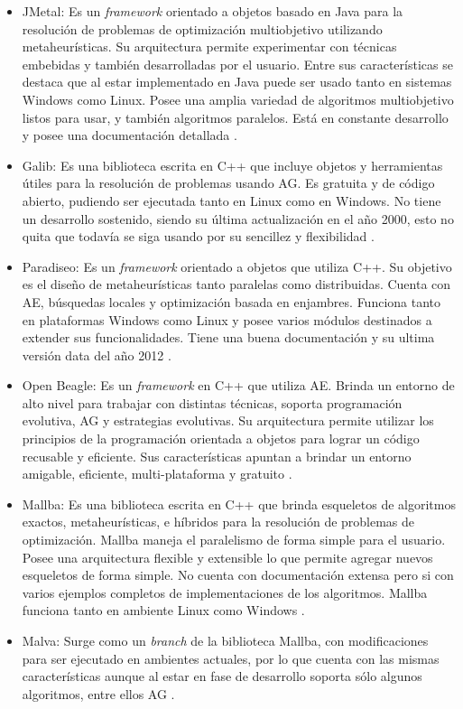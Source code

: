 \begin{itemize}
	\item JMetal: Es un \emph{framework} orientado a objetos basado en Java para la resolución de problemas de optimización multiobjetivo utilizando metaheurísticas. Su arquitectura permite experimentar con técnicas embebidas y también desarrolladas por el usuario. Entre sus características se destaca que al estar implementado en Java puede ser usado tanto en sistemas Windows como Linux. Posee una amplia variedad de algoritmos multiobjetivo listos para usar, y también algoritmos paralelos. Está en constante desarrollo y posee una documentación detallada \citep{Jmetal}.
	
	\item Galib: Es una biblioteca escrita en C++ que incluye objetos y herramientas útiles para la resolución de problemas usando AG. Es gratuita y de código abierto, pudiendo ser ejecutada tanto en Linux como en Windows. No tiene un desarrollo sostenido, siendo su última actualización en el año 2000, esto no quita que todavía se siga usando por su sencillez y flexibilidad \citep{Galib}.
	
	\item Paradiseo: Es un \emph{framework} orientado a objetos que utiliza C++. Su objetivo es el diseño de metaheurísticas tanto paralelas como distribuidas. Cuenta con AE, búsquedas locales y optimización basada en enjambres. Funciona tanto en plataformas Windows como Linux y posee varios módulos destinados a extender sus funcionalidades. Tiene una buena documentación y su ultima versión data del año 2012 \citep{Paradiseo}.
	
	\item Open Beagle: Es un \emph{framework} en C++ que utiliza AE. Brinda un entorno de alto nivel para trabajar con distintas técnicas, soporta programación evolutiva, AG y estrategias evolutivas. Su arquitectura permite utilizar los principios de la programación orientada a objetos para lograr un código recusable y eficiente. Sus características apuntan a brindar un entorno amigable, eficiente, multi-plataforma y gratuito \citep{OpenBeagle}.
	
	\item Mallba: Es una biblioteca escrita en C++ que brinda esqueletos de algoritmos exactos, metaheurísticas, e híbridos para la resolución de problemas de optimización. Mallba maneja el paralelismo de forma simple para el usuario. Posee una arquitectura flexible y extensible lo que permite agregar nuevos esqueletos de forma simple. No cuenta con documentación extensa pero si con varios ejemplos completos de implementaciones de los algoritmos. Mallba funciona tanto en ambiente Linux como Windows \citep{Mallba}.
	
	\item Malva: Surge como un \emph{branch} de la biblioteca Mallba, con modificaciones para ser ejecutado en ambientes actuales, por lo que cuenta con las mismas características aunque al estar en fase de desarrollo soporta sólo algunos algoritmos, entre ellos AG \citep{Malva}.
\end{itemize}

